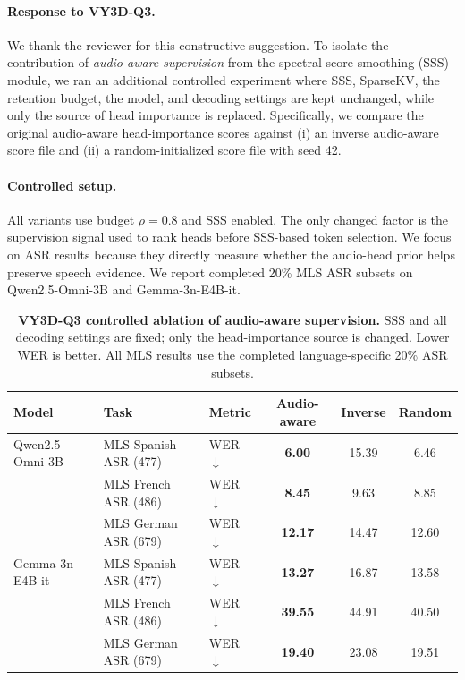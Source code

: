 
\paragraph{Response to VY3D-Q3.}
We thank the reviewer for this constructive suggestion.
To isolate the contribution of \emph{audio-aware supervision} from the spectral score smoothing (SSS) module, we ran an additional controlled experiment where SSS, SparseKV, the retention budget, the model, and decoding settings are kept unchanged, while only the source of head importance is replaced.
Specifically, we compare the original audio-aware head-importance scores against (i) an inverse audio-aware score file and (ii) a random-initialized score file with seed 42.

\paragraph{Controlled setup.}
All variants use budget $\rho=0.8$ and SSS enabled.
The only changed factor is the supervision signal used to rank heads before SSS-based token selection.
We focus on ASR results because they directly measure whether the audio-head prior helps preserve speech evidence.
We report completed 20\% MLS ASR subsets on Qwen2.5-Omni-3B and Gemma-3n-E4B-it.

\begin{table}[htbp]
\centering
\small
\setlength{\tabcolsep}{4pt}
\caption{\textbf{VY3D-Q3 controlled ablation of audio-aware supervision.}
SSS and all decoding settings are fixed; only the head-importance source is changed.
Lower WER is better.
All MLS results use the completed language-specific 20\% ASR subsets.}
\label{tab:rebuttal-vy3d-q3-audio-supervision}
\begin{tabular}{lllccc}
\toprule
\textbf{Model} & \textbf{Task} & \textbf{Metric} & \textbf{Audio-aware} & \textbf{Inverse} & \textbf{Random} \\
\midrule
Qwen2.5-Omni-3B & MLS Spanish ASR (477) & WER $\downarrow$ & \textbf{6.00} & 15.39 & 6.46 \\
 & MLS French ASR (486) & WER $\downarrow$ & \textbf{8.45} & 9.63 & 8.85 \\
 & MLS German ASR (679) & WER $\downarrow$ & \textbf{12.17} & 14.47 & 12.60 \\
\midrule
Gemma-3n-E4B-it & MLS Spanish ASR (477) & WER $\downarrow$ & \textbf{13.27} & 16.87 & 13.58 \\
 & MLS French ASR (486) & WER $\downarrow$ & \textbf{39.55} & 44.91 & 40.50 \\
 & MLS German ASR (679) & WER $\downarrow$ & \textbf{19.40} & 23.08 & 19.51 \\
\bottomrule
\end{tabular}
\end{table}


